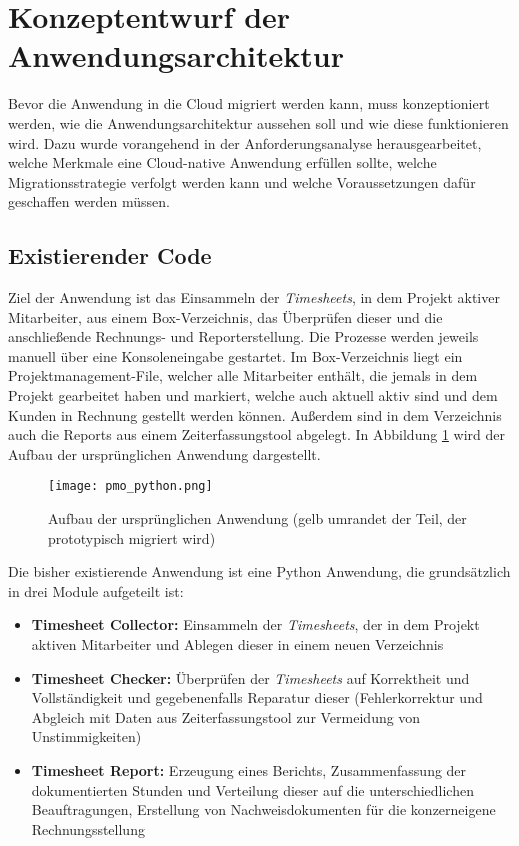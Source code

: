 \section{Konzeptentwurf der Anwendungsarchitektur}
\label{sec:konzeptentwurf}
Bevor die Anwendung in die Cloud migriert werden kann, muss konzeptioniert werden, wie die Anwendungsarchitektur aussehen soll und wie diese funktionieren wird. Dazu wurde vorangehend in der Anforderungsanalyse herausgearbeitet, welche Merkmale eine Cloud-native Anwendung erfüllen sollte, welche Migrationsstrategie verfolgt werden kann und welche Voraussetzungen dafür geschaffen werden müssen.

\subsection{Existierender Code}
Ziel der Anwendung ist das Einsammeln der \textit{\glspl{Timesheet}}, in dem Projekt aktiver Mitarbeiter, aus einem \gls{Box}-Verzeichnis, das Überprüfen dieser und die anschließende Rechnungs- und Reporterstellung. Die Prozesse werden jeweils manuell über eine Konsoleneingabe gestartet. Im \gls{Box}-Verzeichnis liegt ein Projektmanagement-File, welcher alle Mitarbeiter enthält, die jemals in dem Projekt gearbeitet haben und markiert, welche auch aktuell aktiv sind und dem Kunden in Rechnung gestellt werden können. Außerdem sind in dem Verzeichnis auch die Reports aus einem Zeiterfassungstool abgelegt. In Abbildung \ref{fig:pmo_python} wird der Aufbau der ursprünglichen Anwendung dargestellt.

\begin{figure}[H]
    \centering
    \texttt{[image: pmo\_python.png]}
    \caption{Aufbau der ursprünglichen Anwendung (gelb umrandet der Teil, der prototypisch migriert wird)}
    \label{fig:pmo_python}
\end{figure}

Die bisher existierende Anwendung ist eine Python Anwendung, die grundsätzlich in drei Module aufgeteilt ist:
\begin{itemize}
\item \textbf{Timesheet Collector: }Einsammeln der \textit{\glspl{Timesheet}}, der in dem Projekt aktiven Mitarbeiter und Ablegen dieser in einem neuen Verzeichnis
\item \textbf{Timesheet Checker: }Überprüfen der \textit{\glspl{Timesheet}} auf Korrektheit und Vollständigkeit und gegebenenfalls Reparatur dieser (Fehlerkorrektur und Abgleich mit Daten aus Zeiterfassungstool zur Vermeidung von Unstimmigkeiten)
\item \textbf{Timesheet Report: }Erzeugung eines Berichts, Zusammenfassung der dokumentierten Stunden und Verteilung dieser auf die unterschiedlichen Beauftragungen, Erstellung von Nachweisdokumenten für die konzerneigene Rechnungsstellung
\end{itemize}


